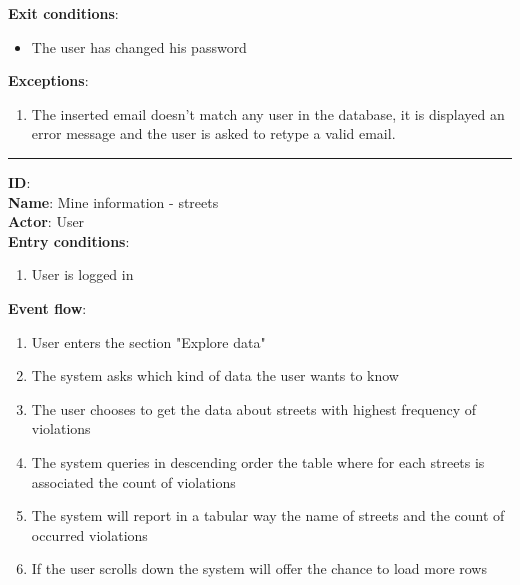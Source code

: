 \begin{enumerate}
\begin{itemize}
\begin{enumerate}
		\end{enumerate}
		\textbf{Exit conditions}:
		\begin{itemize}
			\item{The user has changed his password}
		\end{itemize}
		\textbf{Exceptions}:
		\begin{enumerate}
      		\item{The inserted email doesn't match any user in the database, it is displayed an error message and the user is asked to retype a valid email.}
 		   \end{enumerate}
		\rule{\linewidth}{0.4pt}
		\textbf{ID}:  \\
		\textbf{Name}: Mine information - streets \\
		\textbf{Actor}: User  \\
		\textbf{Entry conditions}:
		\begin{enumerate}
			\item{User is logged in}
		\end{enumerate}
		\textbf{Event flow}:
		\begin{enumerate}
			\item{User enters the section "Explore data"}
			\item{The system asks which kind of data the user wants to know}
      \item{The user chooses to get the data about streets with highest frequency of violations}
      \item{The system queries in descending order the table where for each streets is associated the count of violations }
      \item{The system will report in a tabular way the name of streets and the count of occurred violations}
      \item{If the user scrolls down the system will offer the chance to load more rows}
		\end{enumerate}


\end{itemize}
\end{enumerate}
